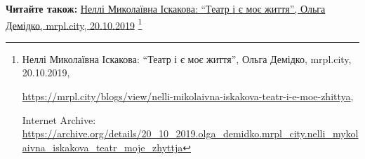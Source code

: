  
 
 
 
 

\def\pubIA{https://archive.org/details/20_10_2019.olga_demidko.mrpl_city.nelli_mykolaivna_iskakova_teatr_moje_zhyttja}
\def\pubTitle{Неллі Миколаївна Іскакова: \enquote{Театр і є моє життя}}
\def\pubDate{20.10.2019}
\def\pubOrigin{https://mrpl.city/blogs/view/nelli-mikolaivna-iskakova-teatr-i-e-moe-zhittya}
\def\pubAuthor{Ольга Демідко}

\textbf{Читайте також:} \href{\pubIA}{%
\pubTitle, \pubAuthor, mrpl.city, \pubDate}%
\footnote{\pubTitle, \pubAuthor, mrpl.city, \pubDate, \par\url{\pubOrigin}, \par Internet Archive: \url{\pubIA}}
